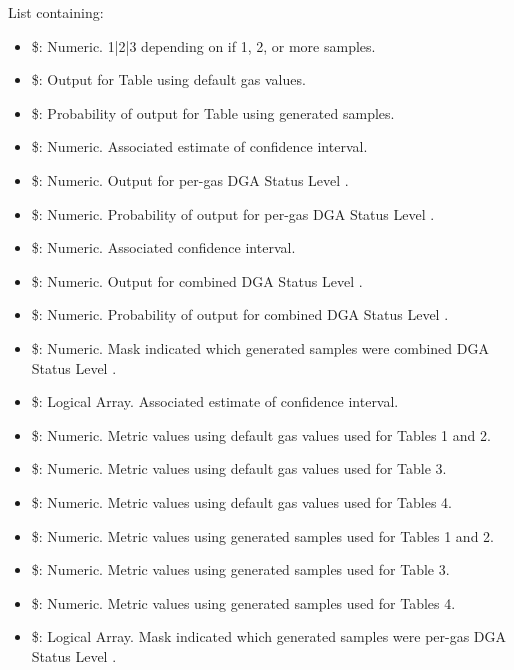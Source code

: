 \documentclass[a4paper]{book}
\begin{document}
\begin{Value}
List containing:
\begin{itemize}

\item{} \$: Numeric. 1|2|3 depending on if 1, 2, or more samples.
\item{} \$: Output for Table  using default gas values.
\item{} \$: Probability of output for Table  using generated samples.
\item{} \$: Numeric. Associated estimate of confidence interval.
\item{} \$: Numeric. Output for per-gas DGA Status Level .
\item{} \$: Numeric. Probability of output for per-gas DGA Status Level .
\item{} \$: Numeric. Associated confidence interval.
\item{} \$: Numeric. Output for combined DGA Status Level .
\item{} \$: Numeric. Probability of output for combined DGA Status Level .
\item{} \$: Numeric. Mask indicated which generated samples were combined DGA Status Level .
\item{} \$: Logical Array. Associated estimate of confidence interval.
\item{} \$: Numeric. Metric values using default gas values used for Tables 1 and 2.
\item{} \$: Numeric. Metric values using default gas values used for Table 3.
\item{} \$: Numeric. Metric values using default gas values used for Tables 4.
\item{} \$: Numeric. Metric values using generated samples used for Tables 1 and 2.
\item{} \$: Numeric. Metric values using generated samples used for Table 3.
\item{} \$: Numeric. Metric values using generated samples used for Tables 4.
\item{} \$: Logical Array. Mask indicated which generated samples were per-gas DGA Status Level .

\end{itemize}

\end{Value}
\end{document}

